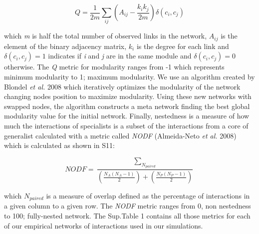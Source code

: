 \documentclass[a4paper, 12pt]{article}
\begin{document}
\begin{equation} \label{supeq:10}
  Q = \frac{1}{2m} \sum_{ij}(A_{ij} - \frac{k_{i}k_{j}}{2m}) \delta(c_{i}, c_{j})
\end{equation}

which \textit{m} is half the total number of observed links in the network, $A_{ij}$ is the element of the binary adjacency matrix, $k_{i}$ is the degree for each link and $\delta(c_{i}, c_{j}) = 1$ indicates if \textit{i} and \textit{j} are in the same module and $\delta(c_{i}, c_{j}) = 0$ otherwise. The \textit{Q} metric for modularity ranges from -1 which represents minimum modularity to 1; maximum modularity. We use an algorithm created by Blondel \textit{et al.} 2008 which iteratively optimizes the modularity of the network changing nodes position to maximize modularity. Using these new networks with swapped nodes, the algorithm constructs a meta network finding the best global modularity value for the initial network. Finally, nestedness is a measure of how much the interactions of specialists is a subset of the interactions from a core of generalist calculated with a metric called \textit{NODF} (Almeida-Neto \textit{et al.} 2008) which is calculated as shown in S11:

\begin{equation} \label{supeq:11}
  NODF = \frac{\sum_{N_{paired}}}{(\frac{N_{A}(N_{A} - 1)}{2}) + (\frac{N_{P}(N_{P} - 1)}{2})}
\end{equation}

which $N_{paired}$ is a measure of overlap defined as the percentage of interactions in a given column to a given row. The \textit{NODF} metric ranges from 0, non nestedness to 100; fully-nested network. The Sup.Table 1 contains all those metrics for each of our empirical networks of interactions used in our simulations.
\end{document}
